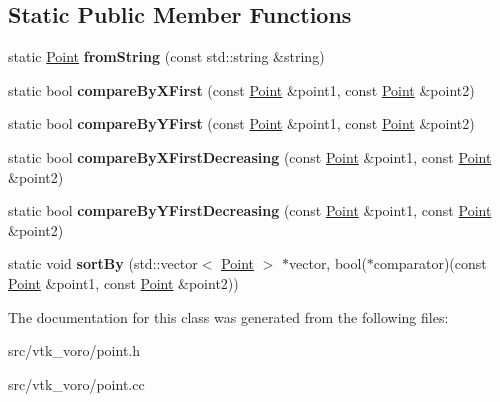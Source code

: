 \subsection*{Static Public Member Functions}
\begin{DoxyCompactItemize}
\item 
static \hyperlink{classgeom_1_1Point}{Point} {\bfseries from\+String} (const std\+::string \&string)\hypertarget{classgeom_1_1Point_a42c06b4179c2cc070d998afd7928f14f}{}\label{classgeom_1_1Point_a42c06b4179c2cc070d998afd7928f14f}

\item 
static bool {\bfseries compare\+By\+X\+First} (const \hyperlink{classgeom_1_1Point}{Point} \&point1, const \hyperlink{classgeom_1_1Point}{Point} \&point2)\hypertarget{classgeom_1_1Point_a48faa7e2acf154addd9d7b9fd51bb200}{}\label{classgeom_1_1Point_a48faa7e2acf154addd9d7b9fd51bb200}

\item 
static bool {\bfseries compare\+By\+Y\+First} (const \hyperlink{classgeom_1_1Point}{Point} \&point1, const \hyperlink{classgeom_1_1Point}{Point} \&point2)\hypertarget{classgeom_1_1Point_a8fb4aee5761d13c9735595aff383c2c1}{}\label{classgeom_1_1Point_a8fb4aee5761d13c9735595aff383c2c1}

\item 
static bool {\bfseries compare\+By\+X\+First\+Decreasing} (const \hyperlink{classgeom_1_1Point}{Point} \&point1, const \hyperlink{classgeom_1_1Point}{Point} \&point2)\hypertarget{classgeom_1_1Point_a252f0ecb261287f905922359a614b908}{}\label{classgeom_1_1Point_a252f0ecb261287f905922359a614b908}

\item 
static bool {\bfseries compare\+By\+Y\+First\+Decreasing} (const \hyperlink{classgeom_1_1Point}{Point} \&point1, const \hyperlink{classgeom_1_1Point}{Point} \&point2)\hypertarget{classgeom_1_1Point_a57c4e9aea8011943cd878fdbc6226fc3}{}\label{classgeom_1_1Point_a57c4e9aea8011943cd878fdbc6226fc3}

\item 
static void {\bfseries sort\+By} (std\+::vector$<$ \hyperlink{classgeom_1_1Point}{Point} $>$ $\ast$vector, bool($\ast$comparator)(const \hyperlink{classgeom_1_1Point}{Point} \&point1, const \hyperlink{classgeom_1_1Point}{Point} \&point2))\hypertarget{classgeom_1_1Point_ac5d45241fe785a4de3962eb26e2b5fc8}{}\label{classgeom_1_1Point_ac5d45241fe785a4de3962eb26e2b5fc8}

\end{DoxyCompactItemize}


The documentation for this class was generated from the following files\+:\begin{DoxyCompactItemize}
\item 
src/vtk\+\_\+voro/point.\+h\item 
src/vtk\+\_\+voro/point.\+cc\end{DoxyCompactItemize}
